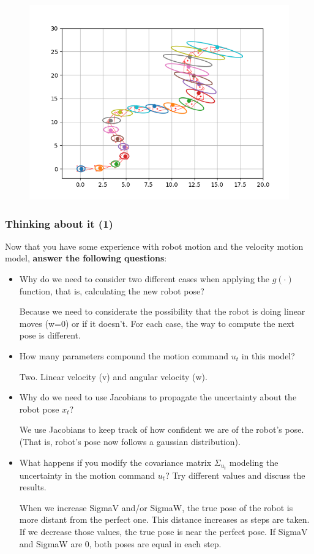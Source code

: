 \documentclass[11pt]{article}
\begin{document}
    
\begin{figure}
\centering
\includegraphics{returns/322.png}
\end{figure}
    
    \hypertarget{thinking-about-it-1}{%
\subsubsection{Thinking about it (1)}\label{thinking-about-it-1}}

Now that you have some experience with robot motion and the velocity
motion model, \textbf{answer the following questions}:

\begin{itemize}
\item
  Why do we need to consider two different cases when applying the
  \(g(\cdot)\) function, that is, calculating the new robot pose?

  Because we need to considerate the possibility that the robot is doing
  linear moves (w=0) or if it doesn't. For each case, the way to compute
  the next pose is different.
\item
  How many parameters compound the motion command \(u_t\) in this model?

  Two. Linear velocity (v) and angular velocity (w).
\item
  Why do we need to use Jacobians to propagate the uncertainty about the
  robot pose \(x_t\)?

  We use Jacobians to keep track of how confident we are of the robot's
  pose. (That is, robot's pose now follows a gaussian distribution).
\item
  What happens if you modify the covariance matrix \(\Sigma_{u_t}\)
  modeling the uncertainty in the motion command \(u_t\)? Try different
  values and discuss the results.

  When we increase SigmaV and/or SigmaW, the true pose of the robot is
  more distant from the perfect one. This distance increases as steps
  are taken. If we decrease those values, the true pose is near the
  perfect pose. If SigmaV and SigmaW are 0, both poses are equal in each
  step.
\end{itemize}


    
    
    
\end{document}
